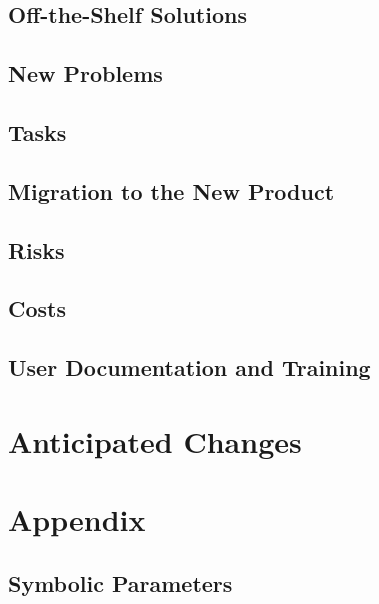\documentclass[11pt]{article}
\begin{document}
\subsection{Off-the-Shelf Solutions}
\subsection{New Problems}
\subsection{Tasks}

\subsection{Migration to the New Product}

\subsection{Risks}

\subsection{Costs}

\subsection{User Documentation and Training}

\section{Anticipated Changes}

\section{Appendix}

\subsection{Symbolic Parameters}
\end{document}
